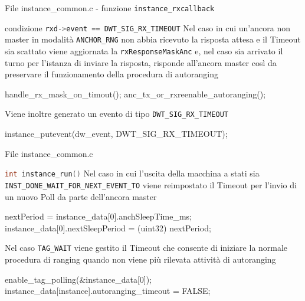\begin{frame}[fragile]{File instance\_common.c - funzione \lstinline[language=C]!instance_rxcallback!}
  \begin{block}{condizione \lstinline[language=C]!rxd->event == DWT_SIG_RX_TIMEOUT!}
    Nel caso in cui un'ancora \alert{non master} in modalità \lstinline[language=C]!ANCHOR_RNG! non abbia ricevuto la risposta attesa e il Timeout sia scattato viene
    aggiornata la \lstinline[language=C]!rxResponseMaskAnc! e, nel caso sia arrivato il turno per l'istanza di inviare la risposta, risponde all'ancora master così da preservare il funzionamento della procedura di autoranging
    \begin{C}
      handle_rx_mask_on_timout();
      anc_tx_or_rxreenable_autoranging();
    \end{C}
    Viene inoltre generato un evento di tipo \lstinline[language=C]!DWT_SIG_RX_TIMEOUT!
    \begin{C}
      instance_putevent(dw_event, DWT_SIG_RX_TIMEOUT);
    \end{C}
  \end{block}
\end{frame}

\begin{frame}[fragile]{File instance\_common.c}
  \begin{block}{\lstinline[language=C]!int instance_run()! \newfunction}
    Nel caso in cui l'uscita della macchina a stati sia \lstinline[language=C]!INST_DONE_WAIT_FOR_NEXT_EVENT_TO! viene reimpostato il Timeout per l'invio di un nuovo Poll
    da parte dell'ancora \alert{master}
    \begin{C}
      nextPeriod = instance_data[0].anchSleepTime_ms;
      instance_data[0].nextSleepPeriod = (uint32) nextPeriod;
    \end{C}
    Nel caso \lstinline[language=C]!TAG_WAIT! viene gestito il Timeout che consente di iniziare la normale procedura di ranging quando
    non viene più rilevata attività di autoranging
    \begin{C}
      enable_tag_polling(&instance_data[0]);
      instance_data[instance].autoranging_timeout = FALSE;
    \end{C}
  \end{block}
\end{frame}


    
